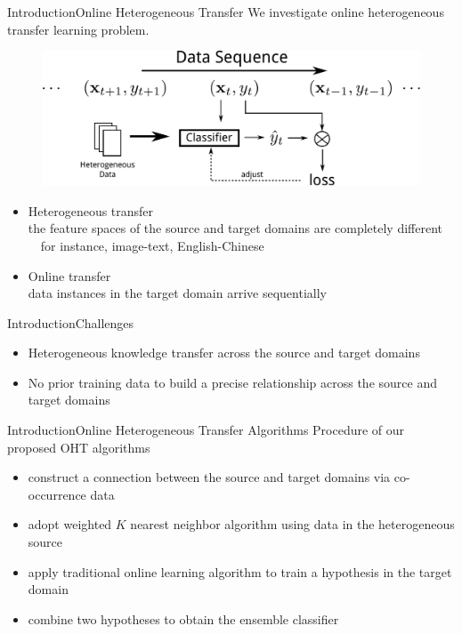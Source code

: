 \documentclass{beamer}
\begin{document}
\begin{frame}{Introduction}{Online Heterogeneous Transfer}
We investigate online heterogeneous transfer learning problem.
\begin{figure}
\centering
\includegraphics[height=0.25\textwidth]{problem.pdf}
\end{figure}
\begin{itemize}
\item
Heterogeneous transfer
\\
the feature spaces of the source and target domains are completely different
\\
~~for instance, image-text, English-Chinese
\item
Online transfer
\\
data instances in the target domain arrive sequentially
\end{itemize}
\end{frame}

\begin{frame}{Introduction}{Challenges}
\begin{itemize}
\item
Heterogeneous knowledge transfer across the source and target domains
\item
No prior training data to build a precise relationship across the source and target domains
\end{itemize}
\end{frame}

\begin{frame}{Introduction}{Online Heterogeneous Transfer Algorithms}
Procedure of our proposed OHT algorithms
\begin{itemize}
\item
construct a connection between the source and target domains via co-occurrence data
\item
adopt weighted $K$ nearest neighbor algorithm using data in the heterogeneous source
\item
apply traditional online learning algorithm to train a hypothesis in the target domain 
\item
combine two hypotheses to obtain the ensemble classifier
\end{itemize}
\end{frame}
\end{document}

